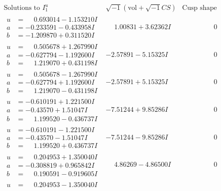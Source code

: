 \documentclass[1p]{elsarticle_modified}
\theoremstyle{definition}
\newcommand{\I}{\sqrt{-1}}
\begin{document}
$$\begin{array}{c|c|c}
\text{Solutions to }I^u_{1}& \I (\text{vol} + \sqrt{-1}CS) & \text{Cusp shape}\\
 \hline 
\begin{aligned}
u &= \phantom{-}0.693014 - 1.153210 I \\
a &= -0.233591 - 0.433958 I \\
b &= -1.209870 + 0.311520 I\end{aligned}
 & \phantom{-}1.00831 + 3.62362 I & \phantom{-0.000000 } 0 \\ \hline\begin{aligned}
u &= \phantom{-}0.505678 + 1.267990 I \\
a &= -0.627794 - 1.192600 I \\
b &= \phantom{-}1.219070 + 0.431198 I\end{aligned}
 & -2.57891 - 5.15325 I & \phantom{-0.000000 } 0 \\ \hline\begin{aligned}
u &= \phantom{-}0.505678 - 1.267990 I \\
a &= -0.627794 + 1.192600 I \\
b &= \phantom{-}1.219070 - 0.431198 I\end{aligned}
 & -2.57891 + 5.15325 I & \phantom{-0.000000 } 0 \\ \hline\begin{aligned}
u &= -0.610191 + 1.221500 I \\
a &= -0.43570 + 1.51047 I \\
b &= \phantom{-}1.199520 - 0.436737 I\end{aligned}
 & -7.51244 + 9.85286 I & \phantom{-0.000000 } 0 \\ \hline\begin{aligned}
u &= -0.610191 - 1.221500 I \\
a &= -0.43570 - 1.51047 I \\
b &= \phantom{-}1.199520 + 0.436737 I\end{aligned}
 & -7.51244 - 9.85286 I & \phantom{-0.000000 } 0 \\ \hline\begin{aligned}
u &= \phantom{-}0.204953 + 1.350040 I \\
a &= -0.308819 + 0.965842 I \\
b &= \phantom{-}0.190591 - 0.919605 I\end{aligned}
 & \phantom{-}4.86269 - 4.86500 I & \phantom{-0.000000 } 0 \\ \hline\begin{aligned}
u &= \phantom{-}0.204953 - 1.350040 I \\

\end{aligned}
\end{array}$$
\end{document}
